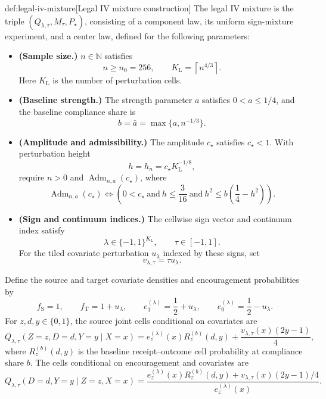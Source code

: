 \documentclass[11pt]{article}
\begin{document}
\begin{algorithmv}{def:legal-iv-mixture}[Legal IV mixture construction]
The legal IV mixture is the triple \((Q_{\lambda,\tau},M_{\tau},P_{\star})\), consisting of a component law, its uniform sign-mixture experiment, and a center law, defined for the following parameters:
\begin{itemize}
\item \textbf{(Sample size.)} \(n\in\mathbb N\) satisfies
\[
n\ge n_0=256,
\qquad
K_{\mathrm L}=\left\lceil n^{4/3}\right\rceil.
\]
Here \(K_{\mathrm L}\) is the number of perturbation cells.
\item \textbf{(Baseline strength.)} The strength parameter \(a\) satisfies \(0<a\le1/4\), and the baseline compliance share is
\[
b=\bar a=\max\{a,n^{-1/3}\}.
\]
\item \textbf{(Amplitude and admissibility.)} The amplitude \(c_{\star}\) satisfies \(c_{\star}<1\). With perturbation height
\[
h=h_n=c_{\star}K_{\mathrm L}^{-1/8},
\]
require \(n>0\) and \(\operatorname{Adm}_{n,a}(c_{\star})\), where
\[
\operatorname{Adm}_{n,a}(c_{\star})
\Longleftrightarrow
\left(
0<c_{\star}
\ \text{and}\
h\le\frac{3}{16}
\ \text{and}\
h^2\le b\left(\frac14-h^2\right)
\right).
\]
\item \textbf{(Sign and continuum indices.)} The cellwise sign vector and continuum index satisfy
\[
\lambda\in\{-1,1\}^{K_{\mathrm L}},
\qquad
\tau\in[-1,1].
\]
For the tiled covariate perturbation \(u_{\lambda}\) indexed by these signs, set
\[
v_{\lambda,\tau}=\tau u_{\lambda}.
\]
\end{itemize}

Define the source and target covariate densities and encouragement probabilities by
\[
f_{\mathrm S}=1,
\qquad
f_{\mathrm T}=1+u_{\lambda},
\qquad
e_1^{(\lambda)}=\frac12+u_{\lambda},
\qquad
e_0^{(\lambda)}=\frac12-u_{\lambda}.
\]
For \(z,d,y\in\{0,1\}\), the source joint cells conditional on covariates are
\[
Q_{\lambda,\tau}(Z=z,D=d,Y=y\mid X=x)
=
e_z^{(\lambda)}(x)R_z^{(b)}(d,y)
+\frac{v_{\lambda,\tau}(x)(2y-1)}4,
\]
where \(R_z^{(b)}(d,y)\) is the baseline receipt–outcome cell probability at compliance share \(b\). The cells conditional on encouragement and covariates are
\[
Q_{\lambda,\tau}(D=d,Y=y\mid Z=z,X=x)
=
\frac{
e_z^{(\lambda)}(x)R_z^{(b)}(d,y)
+v_{\lambda,\tau}(x)(2y-1)/4
}{
e_z^{(\lambda)}(x)
}.
\]


\end{algorithmv}
\end{document}
